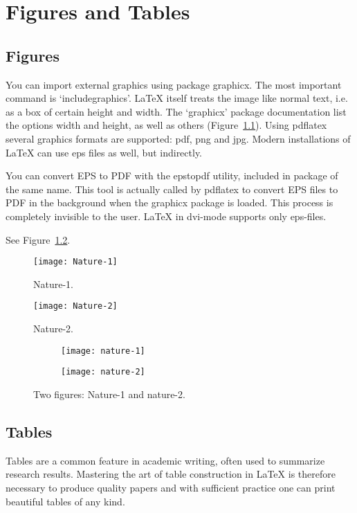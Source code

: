 \chapter{Figures and Tables}

\section{Figures}
You can import external graphics using package graphicx. The most important command is `includegraphics'. LaTeX itself treats the image like normal text, i.e. as a box of certain height and width. The `graphicx' package documentation list the options width and height, as well as others (Figure~\ref{fig:Nature-1}). Using pdflatex several graphics formats are supported: pdf, png and jpg. Modern installations of LaTeX can use eps files as well, but indirectly.

You can convert EPS to PDF with the epstopdf utility, included in package of the same name. This tool is actually called by pdflatex to convert EPS files to PDF in the background when the graphicx package is loaded. This process is completely invisible to the user. LaTeX in dvi-mode supports only eps-files. 

See Figure~\ref{fig:Nature-2}. 

\begin{figure}[b]
	\centering
	\texttt{[image: Nature-1]}
	\caption{Nature-1.}
	\label{fig:Nature-1}
\end{figure}

\begin{figure}
	\centering
	\texttt{[image: Nature-2]}
	\caption{Nature-2.}
	\label{fig:Nature-2}
\end{figure}

\begin{figure}[tbp]
	\centering
	\begin{subfigure}[b]{0.45\textwidth}
		\texttt{[image: nature-1]}
		\caption{}
		\label{fig:n1}
	\end{subfigure}
	\qquad
	\begin{subfigure}[b]{0.45\textwidth}
		\texttt{[image: nature-2]}
		\caption{}
		\label{fig:n2}
	\end{subfigure}
	\caption{Two figures: Nature-1 and nature-2.}\label{fig:figs}
\end{figure}

\section{Tables}
Tables are a common feature in academic writing, often used to summarize research results. Mastering the art of table construction in LaTeX is therefore necessary to produce quality papers and with sufficient practice one can print beautiful tables of any kind.

